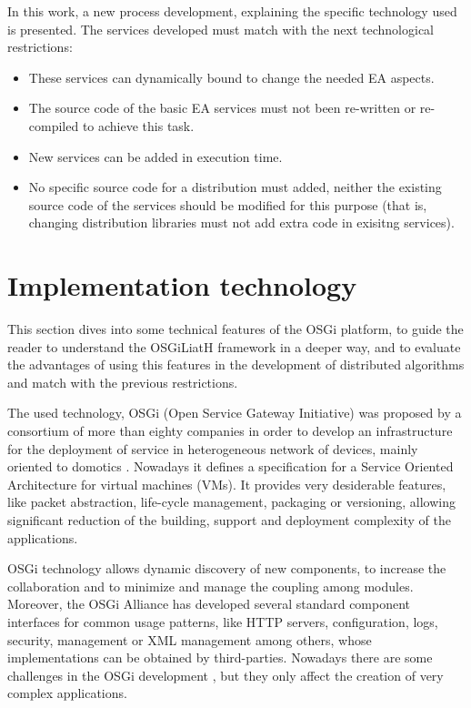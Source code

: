 \documentclass{sig-alternate}
\begin{document}
In this work, a new process development, explaining the specific technology used is presented. The services developed must match with the next technological restrictions:
\begin{itemize}
\item These services can dynamically bound to cha\-nge the needed EA aspects. 
\item The source code of  the basic EA services must not been re-written or re-compiled to achieve this task. 
\item New services can be added in execution time. 
\item No specific source code for a distribution must added, neither the existing source code of the services should be modified for this purpose (that is, changing distribution libraries must not add extra code in exisitng services).
\end{itemize}











\section{Implementation technology}
\label{sec:technology}
This section dives into some technical features of the OSGi platform, to guide the reader to understand the OSGiLiatH framework in a deeper way, and to evaluate the advantages of using this features in the development of distributed algorithms and match with the previous restrictions.

The used technology, OSGi (Open Service Gateway Initiative) \cite{OSGI} was proposed by a consortium of more than
eighty companies in order to develop an infrastructure for the
deployment of service in heterogeneous network of devices, mainly
oriented to domotics \cite{GATEWAY}. Nowadays it defines a
specification for a Service Oriented Architecture for virtual
machines (VMs). It provides very desiderable features, like
packet abstraction, life-cycle management, packaging or versioning,
allowing significant reduction of the building, support and deployment
complexity of the applications. 

OSGi technology allows dynamic discovery of new components, to increase the collaboration and to minimize and manage the coupling
among modules. Moreover, the
OSGi Alliance has developed several standard component interfaces for
common usage patterns, like HTTP servers, configuration, logs, security,
management or XML management among others, whose implementations can
be obtained by third-parties. Nowadays there are some challenges 
in the OSGi development \cite{OSGICHALLENGES}, but they only affect the creation of very complex applications.
\end{document}
